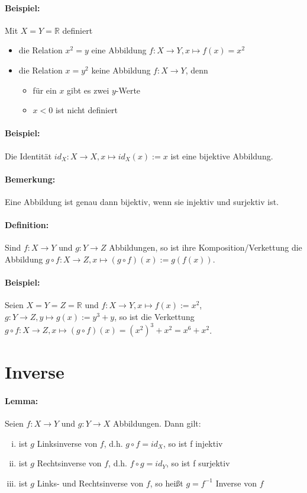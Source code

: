 \paragraph{Beispiel:}
	Mit $X=Y=\mathbb{R}$ definiert
	\begin{itemize}
		\item die Relation $x^2 = y$ eine Abbildung $f:X\to Y, x\mapsto f(x)=x^2$
		\item die Relation $x=y^2$ keine Abbildung $f:X\to Y$, denn
		\begin{itemize}
			\item für ein $x$ gibt es zwei $y$-Werte
			\item $x < 0$ ist nicht definiert
		\end{itemize}
	\end{itemize}

\paragraph{Beispiel:}
	Die Identität $id_X :X\to X, x\mapsto id_X(x):= x$ ist eine bijektive Abbildung.
	
\paragraph{Bemerkung:}
	Eine Abbildung ist genau dann bijektiv, wenn sie injektiv und surjektiv ist.
	
\paragraph{Definition:}
	Sind $ f:X\to Y $ und $ g:Y\to Z$ Abbildungen, so ist ihre Komposition/Verkettung die Abbildung $ g\circ f:X\to Z, x\mapsto (g\circ f)(x):= g(f(x)) $.
	
\paragraph{Beispiel:}
	Seien $ X = Y = Z = \mathbb{R} $ und $ f:X\to Y, x\mapsto f(x) :=x^2 $, $ g:Y\to Z, y\mapsto g(x):=y^3 + y $, so ist die Verkettung $ g\circ f: X\to Z, x\mapsto (g\circ f)(x) = (x^2)^3+x^2 = x^6 + x^2 $.

\section{Inverse}
\paragraph{Lemma:}
	Seien $ f:X\to Y $ und $ g:Y\to X $ Abbildungen. Dann gilt:
	\begin{enumerate}[i)]
		\item ist $ g $ Linksinverse von $ f $, d.h. $ g\circ f = id_X $, so ist f injektiv
		\item ist $ g $ Rechtsinverse von $ f $, d.h. $ f\circ g = id_Y$, so ist f surjektiv
		\item ist $ g $ Links- und Rechtsinverse von $ f $, so heißt $ g =f^{-1}$ Inverse von $ f $
	\end{enumerate}

